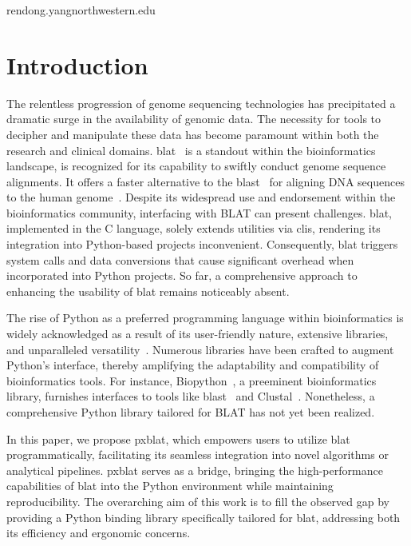 \begin{corrauthor}
	rendong.yang\at northwestern.edu
\end{corrauthor}

\section*{Introduction}\label{sec:introduction}

The relentless progression of genome sequencing technologies has precipitated a dramatic surge in the availability of genomic data.
The necessity for tools to decipher and manipulate these data has become paramount within both the research and clinical domains.
\gls{blat}~\citep{kent2002blat} is a standout within the bioinformatics landscape, is recognized for its capability to swiftly conduct genome sequence alignments.
It offers a faster alternative to the \gls{blast}~\citep{altschul1990basic} for aligning DNA sequences to the human genome~\citep{kent2002blat}.
Despite its widespread use and endorsement within the bioinformatics community, interfacing with BLAT can present challenges.
\gls{blat}, implemented in the C language, solely extends utilities via \glspl{cli}, rendering its integration into Python-based projects inconvenient.
Consequently, \gls{blat} triggers system calls and data conversions that cause significant overhead when incorporated into Python projects.
So far, a comprehensive approach to enhancing the usability of \gls{blat} remains noticeably absent.

The rise of Python as a preferred programming language within bioinformatics is widely acknowledged as a result of its user-friendly nature, extensive libraries, and unparalleled versatility~\citep{perkel2015programming}.
Numerous libraries have been crafted to augment Python's interface, thereby amplifying the adaptability and compatibility of bioinformatics tools.
For instance, Biopython~\citep{cock2009biopython}, a preeminent bioinformatics library, furnishes interfaces to tools like \gls{blast}~\citep{altschul1990basic} and Clustal~\citep{higgins1988clustal}.
Nonetheless, a comprehensive Python library tailored for BLAT has not yet been realized.

In this paper, we propose \gls{pxblat}, which empowers users to utilize \gls{blat} programmatically, facilitating its seamless integration into novel algorithms or analytical pipelines.
\gls{pxblat} serves as a bridge, bringing the high-performance capabilities of \gls{blat} into the Python environment while maintaining reproducibility.
The overarching aim of this work is to fill the observed gap by providing a Python binding library specifically tailored for \gls{blat}, addressing both its efficiency and ergonomic concerns.

